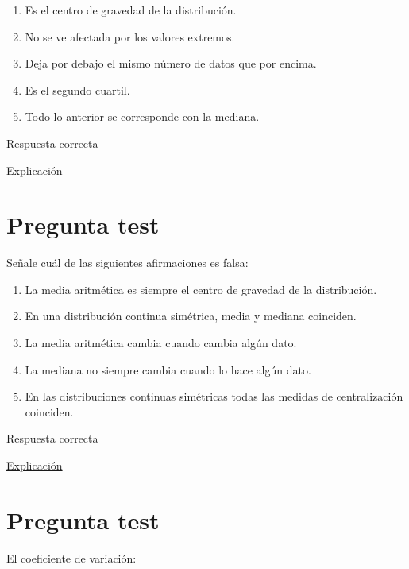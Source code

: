 \documentclass[
]{book}
\providecommand{\tightlist}{%
  \setlength{\itemsep}{0pt}\setlength{\parskip}{0pt}}
\begin{document}
\begin{enumerate}
\def\labelenumi{\alph{enumi})}
\tightlist
\item
  Es el centro de gravedad de la distribución.
\item
  No se ve afectada por los valores extremos.
\item
  Deja por debajo el mismo número de datos que por encima.
\item
  Es el segundo cuartil.
\item
  Todo lo anterior se corresponde con la mediana.
\end{enumerate}

Respuesta correcta

\href{https://1fjmanzano.github.io/bioestadistica/medidas-de-posicio\%CC\%81n-dispersio\%CC\%81n-y-forma.html\#medidas-de-posicio\%CC\%81n-centrales}{Explicación}

\hypertarget{pregunta-test-38}{%
\section{Pregunta test}\label{pregunta-test-38}}

Señale cuál de las siguientes afirmaciones es falsa:

\begin{enumerate}
\def\labelenumi{\alph{enumi})}
\tightlist
\item
  La media aritmética es siempre el centro de gravedad de la distribución.
\item
  En una distribución continua simétrica, media y mediana coinciden.
\item
  La media aritmética cambia cuando cambia algún dato.
\item
  La mediana no siempre cambia cuando lo hace algún dato.
\item
  En las distribuciones continuas simétricas todas las medidas de centralización coinciden.
\end{enumerate}

Respuesta correcta

\href{https://www.statisticshowto.com/what-is-a-bimodal-distribution/}{Explicación}

\hypertarget{pregunta-test-39}{%
\section{Pregunta test}\label{pregunta-test-39}}

El coeficiente de variación:
\end{document}
